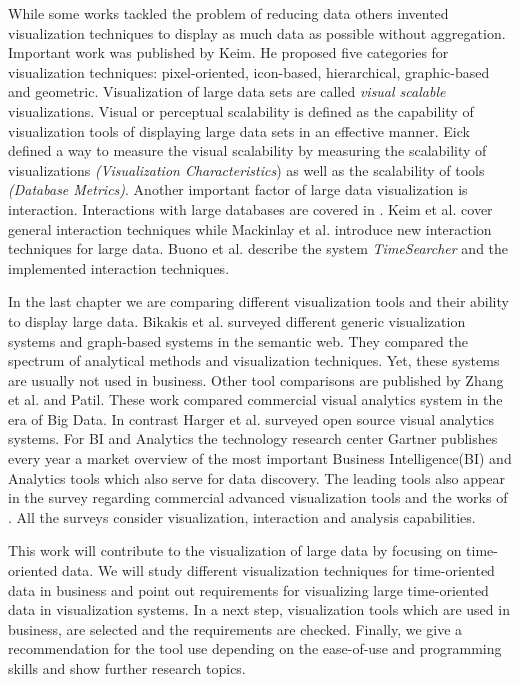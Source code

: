 While some works tackled the problem of reducing data others invented visualization techniques to display as much data as possible without aggregation\cite{Krzywinski2009,Luo2012,Fekete2002}. Important work was published by Keim\cite{Keim1996}. He proposed five categories for visualization techniques: pixel-oriented\cite{Keim1995,Stein2013,Keim2000,keim1996pixel,Keim2001, Keim2005,Keim2008VisualChallenges}, icon-based\cite{Chung2014,Borgo2013,Fanea2005}, hierarchical\cite{Yang2003,Shneiderman1992,LeBlanc1990}, graphic-based and geometric\cite{Noirhomme-Fraiture2002}. Visualization of large data sets are called \textit{visual scalable} visualizations. Visual or perceptual scalability is defined as the capability of visualization tools of displaying large data sets in an effective manner\cite{Eick2002}. Eick defined a way to measure the visual scalability by measuring the scalability of visualizations \textit{(Visualization Characteristics}) as well as the scalability of tools \textit{(Database Metrics)}. 
Another important factor of large data visualization is interaction. Interactions with large databases are covered in \cite{Buono,Jerding1998,mackinlay1991perspective,Keim2005}. Keim et al.\cite{Keim2005} cover general interaction techniques while Mackinlay et al. introduce new interaction techniques for large data\cite{mackinlay1991perspective}. Buono et al. describe the system \textit{TimeSearcher} and the implemented interaction techniques\cite{Buono}.
\par
In the last chapter we are comparing different visualization tools and their ability to display large data.  Bikakis et al. surveyed different generic visualization systems and graph-based systems in the semantic web\cite{Bikakis2016}. They compared the spectrum of analytical methods and visualization techniques. Yet, these systems are usually not used in business. 
Other tool comparisons are published by Zhang et al.\cite{Zhanga} and Patil\cite{Patil}. These work compared commercial visual analytics system in the era of Big Data. In contrast Harger et al. surveyed open source visual analytics systems\cite{Harger}. For BI and Analytics the technology research center Gartner publishes every year a market overview of the most important Business Intelligence(BI) and Analytics tools which also serve for data discovery. The leading tools also appear in the survey\cite{Evelson2012} regarding commercial advanced visualization tools and the works of \cite{Zhanga}. All the surveys consider visualization, interaction and analysis capabilities.  
\par
This work will contribute to the visualization of large data by focusing on time-oriented data. We will study different visualization techniques for time-oriented data in business and point out requirements for visualizing large time-oriented data in visualization systems. In a next step, visualization tools which are used in business, are selected and the requirements are checked. Finally, we give a recommendation for the tool use depending on the ease-of-use and programming skills and show further research topics.